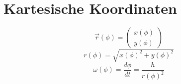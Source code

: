 \section{Kartesische Koordinaten}
\[ \vec{r}(\phi) = \begin{pmatrix} x(\phi) \\ y(\phi) \end{pmatrix} \]
\[ r(\phi) = \sqrt{x(\phi)^2 + y(\phi)^2} \]
\[ \omega(\phi) = \frac{d\phi}{dt} = \frac{h}{r(\phi)^2} \]